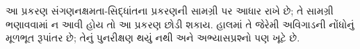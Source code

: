 \documentclass[../../../include/open-logic-chapter]{subfiles}
\begin{document}
\begin{editorial}
  આ પ્રકરણ સંગણનક્ષમતા-સિદ્ધાંતના
  પ્રકરણની સામગ્રી પર આધાર રાખે છે;
  તે સામગ્રી ભણાવવામાં ન આવી
  હોય તો આ પ્રકરણ છોડી શકાય.
  હાલમાં તે જેરેમી અવિગાડની
  નોંધોનું મૂળભૂત રૂપાંતર છે;
  તેનું પુનરીક્ષણ થયું નથી અને
  અભ્યાસપ્રશ્નો પણ ખૂટે છે.
\end{editorial}












\OLEndChapterHook
\end{document}
